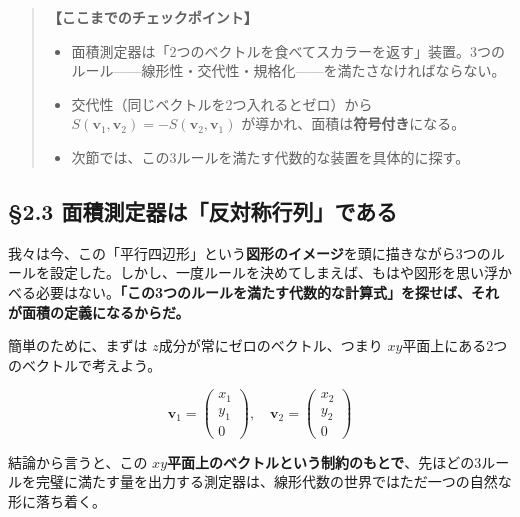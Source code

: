 \documentclass[a4paper,12pt,openany]{book}
\begin{document}
\begin{quote}
\textbf{【ここまでのチェックポイント】}

\begin{itemize}
\item
  面積測定器は「2つのベクトルを食べてスカラーを返す」装置。3つのルール——線形性・交代性・規格化——を満たさなければならない。
\item
  交代性（同じベクトルを2つ入れるとゼロ）から
  \(S(\mathbf{v}_1,\mathbf{v}_2) = -S(\mathbf{v}_2,\mathbf{v}_1)\)
  が導かれ、面積は\textbf{符号付き}になる。
\item
  次節では、この3ルールを満たす代数的な装置を具体的に探す。
\end{itemize}
\end{quote}

\par\vspace{0.35em}\par

\hypertarget{ux9762ux7a4dux6e2cux5b9aux5668ux306fux53cdux5bfeux79f0ux884cux5217ux3067ux3042ux308b}{%
\subsection{§2.3
面積測定器は「反対称行列」である}\label{ux9762ux7a4dux6e2cux5b9aux5668ux306fux53cdux5bfeux79f0ux884cux5217ux3067ux3042ux308b}}

我々は今、この「平行四辺形」という\textbf{図形のイメージ}を頭に描きながら3つのルールを設定した。しかし、一度ルールを決めてしまえば、もはや図形を思い浮かべる必要はない。\textbf{「この3つのルールを満たす代数的な計算式」を探せば、それが面積の定義になるからだ。}

簡単のために、まずは \(z\)成分が常にゼロのベクトル、つまり
\(xy\)平面上にある2つのベクトルで考えよう。

\[
\mathbf{v}_1 = \begin{pmatrix} x_1 \\ y_1 \\ 0 \end{pmatrix}, \quad \mathbf{v}_2 = \begin{pmatrix} x_2 \\ y_2 \\ 0 \end{pmatrix}
\]

結論から言うと、この
\(xy\)\textbf{平面上のベクトルという制約のもとで}、先ほどの3ルールを完璧に満たす量を出力する測定器は、線形代数の世界ではただ一つの自然な形に落ち着く。
\end{document}
